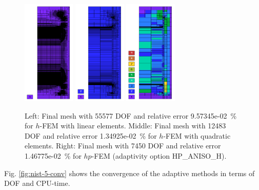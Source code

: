 \documentclass[12pt]{elsarticle}
\begin{document}
\begin{figure}[H]
\centering
\includegraphics[height=5cm]{nist/nist-5/mesh_h1_aniso.png}
\includegraphics[height=5cm]{nist/nist-5/mesh_h2_aniso.png}
\includegraphics[height=5cm]{nist/nist-5/mesh_hp_aniso.png}
\caption{
Left: Final mesh with 55577 DOF and relative error 9.57345e-02~\% for $h$-FEM with linear elements.
Middle: Final mesh with 12483 DOF and relative error 1.34925e-02~\% for $h$-FEM with quadratic elements.
Right: Final mesh with 7450 DOF and relative error 1.46775e-02~\% for $hp$-FEM (adaptivity option HP\_ANISO\_H).}
\label{fig:nist-5-hp-aniso}
\end{figure}

Fig. \ref{fig:nist-5-conv} shows the convergence of the adaptive methods in terms of DOF and CPU-time.
\end{document}
